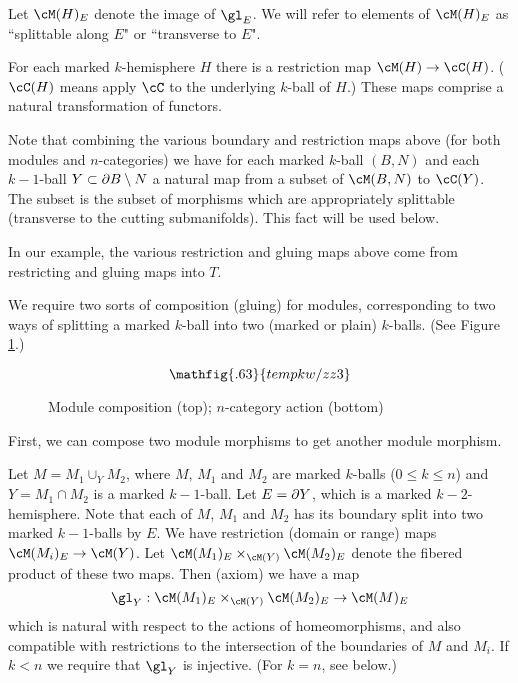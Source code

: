 Let $\cM(H)_E$ denote the image of $\gl_E$.
We will refer to elements of $\cM(H)_E$ as ``splittable along $E$" or ``transverse to $E$". 


{For each marked $k$-hemisphere $H$ there is a restriction map
$\cM(H)\to \cC(H)$.  
($\cC(H)$ means apply $\cC$ to the underlying $k$-ball of $H$.)
These maps comprise a natural transformation of functors.}

Note that combining the various boundary and restriction maps above
(for both modules and $n$-categories)
we have for each marked $k$-ball $(B, N)$ and each $k{-}1$-ball $Y\subset \partial B \setminus N$
a natural map from a subset of $\cM(B, N)$ to $\cC(Y)$.
The subset is the subset of morphisms which are appropriately splittable (transverse to the
cutting submanifolds).
This fact will be used below.

In our example, the various restriction and gluing maps above come from
restricting and gluing maps into $T$.

We require two sorts of composition (gluing) for modules, corresponding to two ways
of splitting a marked $k$-ball into two (marked or plain) $k$-balls.
(See Figure \ref{zzz3}.)

\begin{figure}[!ht]
\begin{equation*}
\mathfig{.63}{tempkw/zz3}
\end{equation*}
\caption{Module composition (top); $n$-category action (bottom)}
\label{zzz3}
\end{figure}

First, we can compose two module morphisms to get another module morphism.

{Let $M = M_1 \cup_Y M_2$, where $M$, $M_1$ and $M_2$ are marked $k$-balls ($0\le k\le n$)
and $Y = M_1\cap M_2$ is a marked $k{-}1$-ball.
Let $E = \partial Y$, which is a marked $k{-}2$-hemisphere.
Note that each of $M$, $M_1$ and $M_2$ has its boundary split into two marked $k{-}1$-balls by $E$.
We have restriction (domain or range) maps $\cM(M_i)_E \to \cM(Y)$.
Let $\cM(M_1)_E \times_{\cM(Y)} \cM(M_2)_E$ denote the fibered product of these two maps. 
Then (axiom) we have a map
\[
	\gl_Y : \cM(M_1)_E \times_{\cM(Y)} \cM(M_2)_E \to \cM(M)_E
\]
which is natural with respect to the actions of homeomorphisms, and also compatible with restrictions
to the intersection of the boundaries of $M$ and $M_i$.
If $k < n$ we require that $\gl_Y$ is injective.
(For $k=n$, see below.)}



